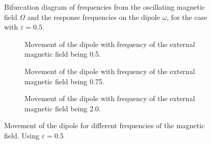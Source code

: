 \begin{figure}
    \centering
    \scalebox{0.7}{}
    \caption{Bifurcation diagram of frequencies from the oscillating magnetic field $\Omega$ and the response frequencies on the dipole $\omega$, for the case with $\varepsilon = 0.5$.}
    \label{fig:bif05}
\end{figure}
\begin{figure*}
    \begin{subfigure}{\textwidth}
        
        \caption{Movement of the dipole with frequency of the external magnetic field being 0.5.}
        \label{fig:omega05}
    \end{subfigure}
    \begin{subfigure}{\textwidth}
        
        \caption{Movement of the dipole with frequency of the external magnetic field being 0.75.}
        \label{fig:omega075}
    \end{subfigure}
    \begin{subfigure}{\textwidth}
        
        \caption{Movement of the dipole with frequency of the external magnetic field being 2.0.}
        \label{fig:omega20}
    \end{subfigure}
    \caption{Movement of the dipole for different frequencies of the magnetic field. Using $\varepsilon = 0.5$}
\end{figure*}
